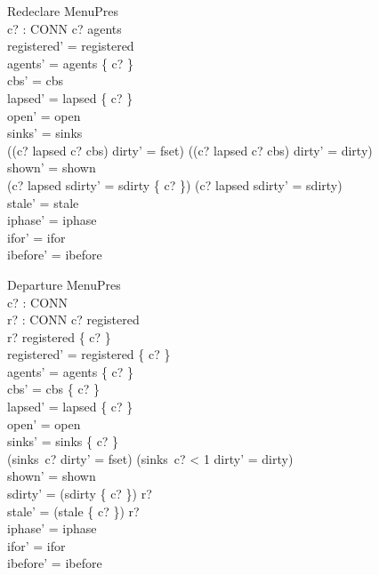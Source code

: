 \documentclass[a4paper,10pt,fleqn]{article}
\begin{document}
\begin{schema}{Redeclare}
  \Delta MenuPres \\
  c? : CONN
\where
  c? \in agents \\
  registered' = registered \\
  agents' = agents \setminus \{ c? \} \\
  cbs' = cbs \\
  lapsed' = lapsed \setminus \{ c? \} \\
  open' = open \\
  sinks' = sinks \\
  ((c? \in lapsed \lor c? \notin cbs) \land dirty' = fset) \lor
    (\lnot (c? \in lapsed \lor c? \notin cbs) \land dirty' = dirty) \\
  shown' = shown \\
  (c? \in lapsed \land sdirty' = sdirty \cup \{ c? \}) \lor
    (c? \notin lapsed \land sdirty' = sdirty) \\
  stale' = stale \\
  iphase' = iphase \\
  ifor' = ifor \\
  ibefore' = ibefore
\end{schema}

\begin{schema}{Departure}
  \Delta MenuPres \\
  c? : CONN \\
  r? : \power CONN
\where
  c? \in registered \\
  r? \subseteq registered \setminus \{ c? \} \\
  registered' = registered \setminus \{ c? \} \\
  agents' = agents \setminus \{ c? \} \\
  cbs' = cbs \setminus \{ c? \} \\
  lapsed' = lapsed \setminus \{ c? \} \\
  open' = open \\
  sinks' = sinks \oplus \{ c?  \} \\
  (sinks~c?  \land dirty' = fset) \lor
    (sinks~c? < 1 \land dirty' = dirty) \\
  shown' = shown \\
  sdirty' = (sdirty \setminus \{ c? \}) \cup r? \\
  stale' = (stale \setminus \{ c? \}) \cup r? \\
  iphase' = iphase \\
  ifor' = ifor \\
  ibefore' = ibefore
\end{schema}
\end{document}
